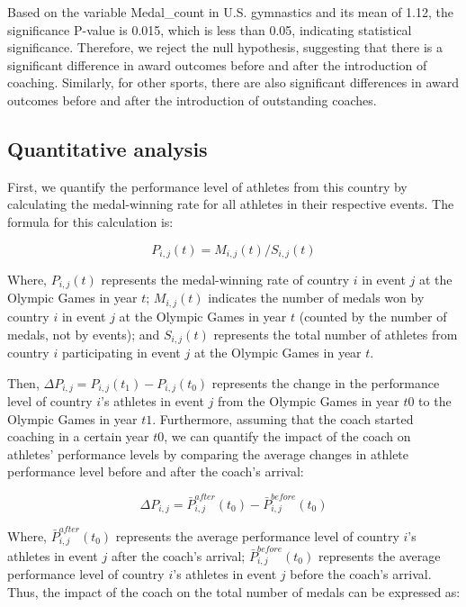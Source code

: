 \documentclass{mcmthesis}
\begin{document}
Based on the variable Medal_count in U.S. gymnastics and its mean of 1.12, the significance P-value is 0.015, which is less than 0.05, indicating statistical significance. Therefore, we reject the null hypothesis, suggesting that there is a significant difference in award outcomes before and after the introduction of coaching. Similarly, for other sports, there are also significant differences in award outcomes before and after the introduction of outstanding coaches.

\subsection{Quantitative analysis}
First, we quantify the performance level of athletes from this country by calculating the medal-winning rate for all athletes in their respective events. The formula for this calculation is:

\begin{equation}
P_{i, j}(t) = M_{i, j}(t) / S_{i, j}(t)
\end{equation}

Where, $P_{i, j}(t)$ represents the medal-winning rate of country $i$ in event $j$ at the Olympic Games in year $t$; $M_{i, j}(t)$ indicates the number of medals won by country $i$ in event $j$ at the Olympic Games in year $t$ (counted by the number of medals, not by events); and $S_{i, j}(t)$ represents the total number of athletes from country $i$ participating in event $j$ at the Olympic Games in year $t$.

Then, $\Delta P_{i, j} = P_{i, j}(t_{1}) - P_{i, j}(t_{0})$ represents the change in the performance level of country $i$'s athletes in event $j$ from the Olympic Games in year $t0$ to the Olympic Games in year $t1$. Furthermore, assuming that the coach started coaching in a certain year $t0$, we can quantify the impact of the coach on athletes' performance levels by comparing the average changes in athlete performance level before and after the coach's arrival:

\begin{equation}
\Delta P_{i, j} = \bar{P}_{i, j}^{after}(t_{0}) - \bar{P}_{i, j}^{before}(t_{0})
\end{equation}

Where, $\bar{P}_{i, j}^{after}(t_{0})$ represents the average performance level of country $i$'s athletes in event $j$ after the coach's arrival; $\bar{P}_{i, j}^{before}(t_{0})$ represents the average performance level of country $i$'s athletes in event $j$ before the coach's arrival. Thus, the impact of the coach on the total number of medals can be expressed as:
\end{document}

